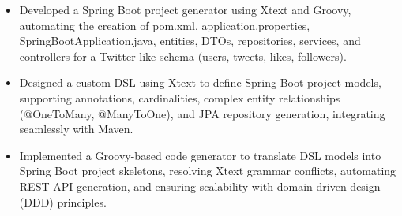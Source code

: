 \begin{samepage}
{
  {\begin{itemize}
    \item Developed a Spring Boot project generator using Xtext and Groovy, automating the creation of pom.xml, application.properties, SpringBootApplication.java, entities, DTOs, repositories, services, and controllers for a Twitter-like schema (users, tweets, likes, followers).
    \item Designed a custom DSL using Xtext to define Spring Boot project models, supporting annotations, cardinalities, complex entity relationships (@OneToMany, @ManyToOne), and JPA repository generation, integrating seamlessly with Maven.
    \item Implemented a Groovy-based code generator to translate DSL models into Spring Boot project skeletons, resolving Xtext grammar conflicts, automating REST API generation, and ensuring scalability with domain-driven design (DDD) principles.
  \end{itemize}
  }
}
\end{samepage}
